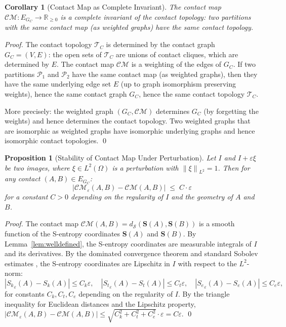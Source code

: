 \documentclass[twocolumn]{article}
\theoremstyle{plain}
\newtheorem{proposition}[theorem]{Proposition}
\newtheorem{corollary}[theorem]{Corollary}
\theoremstyle{definition}
\newcommand{\PP}{\mathcal{P}}
\newcommand{\CM}{\mathcal{CM}}
\newcommand{\TC}{\mathcal{T}_C}
\newcommand{\GC}{G_C}
\newcommand{\Sk}{S_k}
\newcommand{\St}{S_t}
\newcommand{\Se}{S_e}
\newcommand{\bS}{\mathbf{S}}
\newcommand{\dS}{d_{\mathcal{S}}}
\newcommand{\reals}{\mathbb{R}}
\newcommand{\eps}{\varepsilon}
\newcommand{\norm}[1]{\left\lVert #1 \right\rVert}
\newcommand{\abs}[1]{\left\lvert #1 \right\rvert}
\begin{document}
\begin{corollary}[Contact Map as Complete Invariant]
\label{cor:complete}
The contact map $\CM: E_{G_C} \to \reals_{\geq 0}$ is a complete invariant of
the contact topology: two partitions with the same contact map (as weighted graphs)
have the same contact topology.
\end{corollary}

\begin{proof}
The contact topology $\TC$ is determined by the contact graph $\GC = (V, E)$:
the open sets of $\TC$ are unions of contact cliques, which are determined by $E$.
The contact map $\CM$ is a weighting of the edges of $\GC$. If two partitions
$\PP_1$ and $\PP_2$ have the same contact map (as weighted graphs), then they
have the same underlying edge set $E$ (up to graph isomorphism preserving weights),
hence the same contact graph $\GC$, hence the same contact topology $\TC$.

More precisely: the weighted graph $(\GC, \CM)$ determines $\GC$ (by forgetting
the weights) and hence determines the contact topology. Two weighted graphs that
are isomorphic as weighted graphs have isomorphic underlying graphs and hence
isomorphic contact topologies. \qed
\end{proof}

\begin{proposition}[Stability of Contact Map Under Perturbation]
\label{prop:stability}
Let $I$ and $I + \eps \xi$ be two images, where $\xi \in L^2(\Omega)$ is a
perturbation with $\norm{\xi}_{L^2} = 1$. Then for any contact $(A,B) \in E_{G_C}$:
\[
  \abs{\CM_\eps(A,B) - \CM(A,B)} \;\leq\; C \cdot \eps
\]
for a constant $C > 0$ depending on the regularity of $I$ and the geometry of
$A$ and $B$.
\end{proposition}

\begin{proof}
The contact map $\CM(A,B) = \dS(\bS(A), \bS(B))$ is a smooth function of the
S-entropy coordinates $\bS(A)$ and $\bS(B)$. By Lemma~\ref{lem:welldefined},
the S-entropy coordinates are measurable integrals of $I$ and its derivatives.
By the dominated convergence theorem and standard Sobolev estimates \cite{evans2010partial},
the S-entropy coordinates are Lipschitz in $I$ with respect to the $L^2$-norm:
\[
  \abs{{S_k}_\eps(A) - \Sk(A)} \leq C_k \eps, \quad
  \abs{{S_t}_\eps(A) - \St(A)} \leq C_t \eps, \quad
  \abs{{S_e}_\eps(A) - \Se(A)} \leq C_e \eps,
\]
for constants $C_k, C_t, C_e$ depending on the regularity of $I$. By the
triangle inequality for Euclidean distances and the Lipschitz property,
$\abs{\CM_\eps(A,B) - \CM(A,B)} \leq \sqrt{C_k^2 + C_t^2 + C_e^2} \cdot \eps = C\eps$. \qed
\end{proof}
\end{document}

